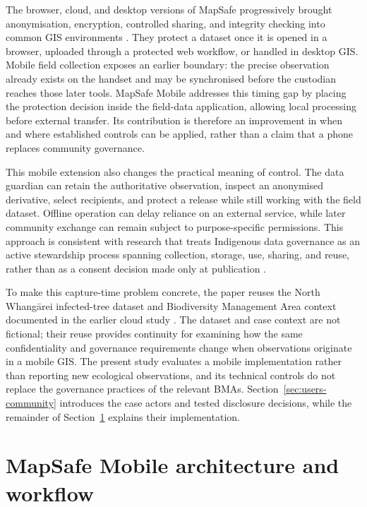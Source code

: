\documentclass[]{interact}
\begin{document}
The browser, cloud, and desktop versions of MapSafe progressively brought anonymisation, encryption, controlled sharing, and integrity checking into common GIS environments \citep{sharma2023mapsafe,sharma2024indigenous,sharma2025mapsafe}. They protect a dataset once it is opened in a browser, uploaded through a protected web workflow, or handled in desktop GIS. Mobile field collection exposes an earlier boundary: the precise observation already exists on the handset and may be synchronised before the custodian reaches those later tools. MapSafe Mobile addresses this timing gap by placing the protection decision inside the field-data application, allowing local processing before external transfer. Its contribution is therefore an improvement in when and where established controls can be applied, rather than a claim that a phone replaces community governance.

This mobile extension also changes the practical meaning of control. The data guardian can retain the authoritative observation, inspect an anonymised derivative, select recipients, and protect a release while still working with the field dataset. Offline operation can delay reliance on an external service, while later community exchange can remain subject to purpose-specific permissions. This approach is consistent with research that treats Indigenous data governance as an active stewardship process spanning collection, storage, use, sharing, and reuse, rather than as a consent decision made only at publication \citep{lovett2019gooddata,carroll2020care,carroll2021operationalizing,bowen2022participatory,reyesgarcia2022}.

To make this capture-time problem concrete, the paper reuses the North Whang\={a}rei infected-tree dataset and Biodiversity Management Area context documented in the earlier cloud study \citep{sharma2024indigenous}. The dataset and case context are not fictional; their reuse provides continuity for examining how the same confidentiality and governance requirements change when observations originate in a mobile GIS. The present study evaluates a mobile implementation rather than reporting new ecological observations, and its technical controls do not replace the governance practices of the relevant BMAs. Section~\ref{sec:users-community} introduces the case actors and tested disclosure decisions, while the remainder of Section~\ref{sec:mapsafeplugin} explains their implementation.

\section{MapSafe Mobile architecture and workflow}
\label{sec:mapsafeplugin}
\end{document}
